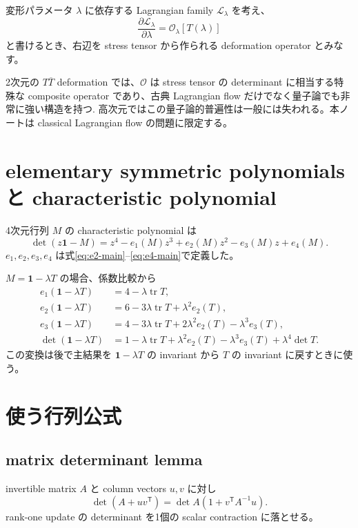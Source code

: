 \documentclass[a4paper,11pt]{ltjsreport}
\newcommand{\tr}{\operatorname{tr}}
\newcommand{\Lag}{\mathcal L}
\newcommand{\Id}{\mathbf 1}
\newcommand{\cO}{\mathcal O}
\begin{document}
変形パラメータ $\lambda$ に依存する Lagrangian family $\Lag_\lambda$ を考え、
\begin{equation}
 \frac{\partial\Lag_\lambda}{\partial\lambda}
 =\cO_\lambda[T(\lambda)]
 \label{eq:flow-general}
\end{equation}
と書けるとき、右辺を stress tensor から作られる deformation operator とみなす。

2次元の $T\overline T$ deformation では、$\cO$ は stress tensor の determinant に相当する特殊な composite operator であり、古典 Lagrangian flow だけでなく量子論でも非常に強い構造を持つ\cite{SmirnovZamolodchikov2016}. 高次元ではこの量子論的普遍性は一般には失われる。本ノートは classical Lagrangian flow の問題に限定する。

\section{elementary symmetric polynomials と characteristic polynomial}

4次元行列 $M$ の characteristic polynomial は
\begin{equation}
 \det(z\Id-M)
 =z^4-e_1(M)z^3+e_2(M)z^2-e_3(M)z+e_4(M).
 \label{eq:charpoly}
\end{equation}
$e_1,e_2,e_3,e_4$ は式\eqref{eq:e2-main}--\eqref{eq:e4-main}で定義した。

$M=\Id-\lambda T$ の場合、係数比較から
\begin{align}
 e_1(\Id-\lambda T)
 &=4-\lambda\tr T,
 \label{eq:E1T}\\
 e_2(\Id-\lambda T)
 &=6-3\lambda\tr T+\lambda^2e_2(T),
 \label{eq:E2T}\\
 e_3(\Id-\lambda T)
 &=4-3\lambda\tr T+2\lambda^2e_2(T)-\lambda^3e_3(T),
 \label{eq:E3T}\\
 \det(\Id-\lambda T)
 &=1-\lambda\tr T+\lambda^2e_2(T)-\lambda^3e_3(T)+\lambda^4\det T.
 \label{eq:E4T}
\end{align}
この変換は後で主結果を $\Id-\lambda T$ の invariant から $T$ の invariant に戻すときに使う。

\section{使う行列公式}

\subsection{matrix determinant lemma}

invertible matrix $A$ と column vectors $u,v$ に対し
\begin{equation}
 \det(A+uv^{\mathsf T})
 =\det A\left(1+v^{\mathsf T}A^{-1}u\right).
 \label{eq:detlemma}
\end{equation}
rank-one update の determinant を1個の scalar contraction に落とせる。
\end{document}
